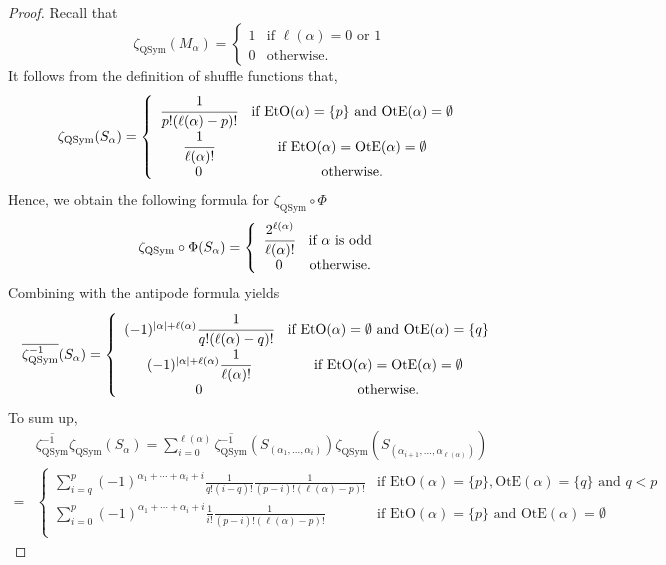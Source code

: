 \documentclass[12pt]{amsart}
\numberwithin{equation}{section}
\newcommand{\QSym}{\mathrm{QSym}}
\newcommand{\OtE}{\mathrm{OtE}}
\newcommand{\EtO}{\mathrm{EtO}}
\begin{document}
\begin{proof}
	Recall that
	$$\zeta_\QSym(M_\alpha)=\left\{\begin{array}{cc}
	1 & \text{if }\ell(\alpha)=0\text{ or }1\\
	0 & \text{otherwise}.
	\end{array}\right.$$
	It follows from the definition of shuffle functions that,
	\begin{equation}\label{eq:3.1}
		\zeta_\QSym(S_\alpha)=\left\{\begin{array}{cc}
			\cfrac{1}{p!(\ell(\alpha)-p)!} & \text{if }\EtO(\alpha)=\{p\}\text{ and }\OtE(\alpha)=\emptyset\\
			\cfrac{1}{\ell(\alpha)!} & \text{if }\EtO(\alpha)=\OtE(\alpha)=\emptyset\\
			0 & \text{otherwise}.
		\end{array}\right.
	\end{equation}
	Hence, we obtain the following formula for $\zeta_\QSym\circ\Phi$
	$$\zeta_\QSym\circ\Phi(S_\alpha)=\left\{\begin{array}{cc}
	\cfrac{2^{\ell(\alpha)}}{\ell(\alpha)!}& \text{if }\alpha\text{ is odd}\\
	0 & \text{otherwise.}
	\end{array}\right.$$
	Combining with the antipode formula yields
	\begin{equation}\label{eq:3.2}
		\overline{\zeta_\QSym^{-1}}(S_\alpha)=\left\{\begin{array}{cc}
			(-1)^{|\alpha|+\ell(\alpha)}\cfrac{1}{q!(\ell(\alpha)-q)!} & \text{if }\EtO(\alpha)=\emptyset\text{ and }\OtE(\alpha)=\{q\}\\
			(-1)^{|\alpha|+\ell(\alpha)}\cfrac{1}{\ell(\alpha)!} & \text{if }\EtO(\alpha)=\OtE(\alpha)=\emptyset\\
			0 & \text{otherwise}.
		\end{array}\right.
	\end{equation}
	To sum up,
	\begin{align*}
	&\overline{\zeta_\QSym^{-1}}\zeta_\QSym(S_\alpha)=\sum_{i=0}^{\ell(\alpha)}\overline{\zeta_\QSym^{-1}}(S_{(\alpha_1,\dots,\alpha_i)})\zeta_\QSym(S_{(\alpha_{i+1},\dots,\alpha_{\ell(\alpha)})})\\
	=&\left\{\begin{array}{cc}
	\displaystyle\sum_{i=q}^p(-1)^{\alpha_1+\cdots+\alpha_i+i}\frac{1}{q!(i-q)!}\frac{1}{(p-i)!(\ell(\alpha)-p)!} & \text{if }\EtO(\alpha)=\{p\},\OtE(\alpha)=\{q\}\text{ and }q<p\\
	\displaystyle\sum_{i=0}^p(-1)^{\alpha_1+\cdots+\alpha_i+i}\frac{1}{i!}\frac{1}{(p-i)!(\ell(\alpha)-p)!} & \text{if }\EtO(\alpha)=\{p\}\text{ and }\OtE(\alpha)=\emptyset\\

\end{array}
\end{align*}
\end{proof}
\end{document}
